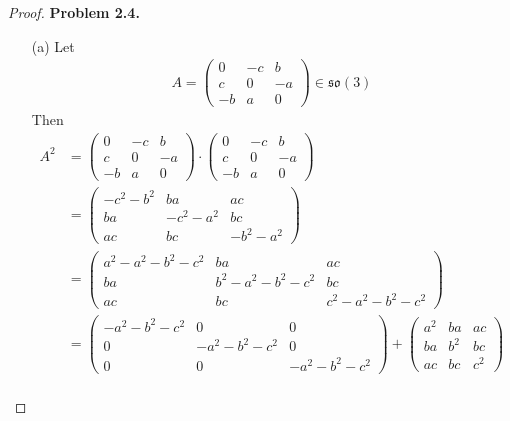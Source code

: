 \documentclass[11pt]{article}
\theoremstyle{definition}
\begin{document}
\begin{proof}{\textbf{Problem 2.4.}}
\begin{itemize}
    \item [(a)] Let 
    \begin{align*}
        A = \begin{pmatrix}
            0 & -c & b\\
            c & 0 & -a\\
            -b & a & 0
        \end{pmatrix} \in \mathfrak{so}(3)
    \end{align*}
    Then
    \begin{align*}
        A^2 &= \begin{pmatrix}
            0 & -c & b\\
            c & 0 & -a\\
            -b & a & 0
        \end{pmatrix}
        \cdot \begin{pmatrix}
            0 & -c & b\\
            c & 0 & -a\\
            -b & a & 0
        \end{pmatrix}\\
        &= \begin{pmatrix}
            -c^2 -b^2 & ba & ac\\
            ba & -c^2-a^2 & bc\\
            ac & bc & -b^2-a^2
        \end{pmatrix}\\
        &= \begin{pmatrix}
            a^2-a^2-b^2-c^2 & ba & ac\\
            ba & b^2-a^2-b^2-c^2 & bc\\
            ac & bc & c^2-a^2-b^2-c^2
        \end{pmatrix}\\
        &= \begin{pmatrix}
            -a^2-b^2-c^2 & 0 & 0\\
            0 & -a^2-b^2-c^2 & 0\\
            0 & 0 & -a^2-b^2-c^2
        \end{pmatrix} + \begin{pmatrix}
            a^2 & ba & ac\\
            ba & b^2 & bc\\
            ac & bc & c^2
        \end{pmatrix}\\

\end{align*}
\end{itemize}
\end{proof}
\end{document}
